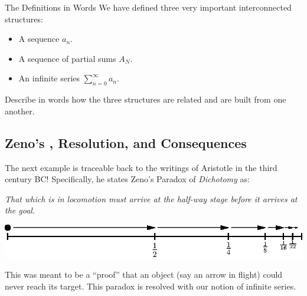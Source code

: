 \begin{exercise}{The Definitions in Words \Coffeecup \Coffeecup}
We have defined three very important interconnected structures: 
\begin{itemize}
\item A sequence $a_n$.
\item A sequence of partial sums $A_N$.
\item An infinite series $\sum_{n=0}^\infty a_n$.
\end{itemize}
Describe in words how the three structures are related and are built from one another.
 \end{exercise}
 
 \subsection{Zeno's , Resolution, and Consequences}\label{infser} 
 
The next example is traceable back to the writings of Aristotle in the third century BC!  Specifically, he states Zeno's Paradox of \emph{Dichotomy} as: \begin{center}
\emph{That which is in locomotion must arrive at the half-way stage before it arrives at the goal.}
\end{center}

	\begin{center}
		\includegraphics[width=400pt]{ChapterSeqSer/Figures/zeno.eps}
	\end{center}

This was meant to be a ``proof'' that an object (say an arrow in flight) could never reach its target.  This paradox is resolved with our notion of infinite series. 

